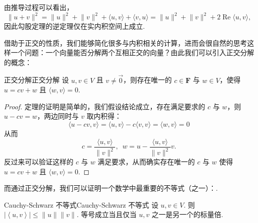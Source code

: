 由推导过程可以看出，
\begin{equation} \label{eq:19:勾股定理展开}
    \lVert u + v \rVert^2 = \lVert u \rVert^2 + \lVert v \rVert^2 + \langle u, v \rangle + \langle v, u \rangle = \lVert u \rVert^2 + \lVert v \rVert^2 + 2\operatorname{Re}\langle u, v \rangle,
\end{equation}
因此勾股定理的逆定理仅在实内积空间上成立.

借助于正交的性质，我们能够简化很多与内积相关的计算，进而会很自然的思考这样一个问题：一个向量能否分解两个互相正交的向量？由此我们可以引入正交分解的概念：

\begin{theorem}{正交分解}{正交分解}
    设 $u, v \in V$ 且 $v \neq \vec{0}$，则存在唯一的 $c\in\mathbf{F}$ 与 $w\in V$，使得 $u = cv + w$ 且 $\langle w, v \rangle = 0$.
\end{theorem}

\begin{proof}
定理的证明是简单的，我们假设结论成立，存在满足要求的 $c$ 与 $w$，则 $u-cv=w$，两边同时与 $v$ 取内积得：
\[
\langle u-cv, v \rangle = \langle u, v \rangle - c\langle v, v \rangle = \langle w, v \rangle = 0
\]
从而 \[c = \dfrac{\langle u, v \rangle}{\|v\|^2},\enspace w = u - \dfrac{\langle u, v \rangle}{\|v\|^2}v.\]
反过来可以验证这样的 $c$ 与 $w$ 满足要求，从而确实存在唯一的 $c$ 与 $w$ 使得 $u = cv + w$ 且 $\langle w, v \rangle = 0$.
\end{proof}

而通过正交分解，我们可以证明一个数学中最重要的不等式（之一）：.

\begin{theorem}{Cauchy-Schwarz 不等式}{Cauchy-Schwarz 不等式} 
    设 $u, v \in V$. 则 $\left\lvert \left\langle u, v\right\rangle \right\rvert \leqslant \lVert u \rVert\lVert v \rVert$. 等号成立当且仅当 $u, v$ 之一是另一个的标量倍.
\end{theorem}

